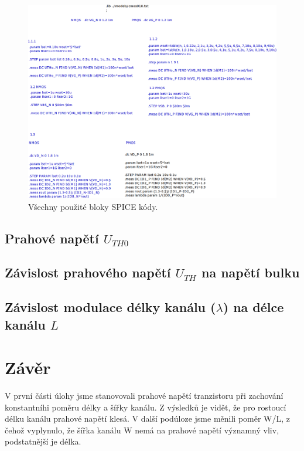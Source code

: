 \documentclass{protokol}
\begin{document}
  \begin{figure}[h!]
    \centering
    \includegraphics[width=\textwidth]{img/spice.png}
    \caption{Všechny použité bloky SPICE kódy.}
    \label{fig:img-spice-png}
  \end{figure}


  \clearpage
\subsection{Prahové napětí \(U_{TH0} \) }


\clearpage
\subsection{Závislost prahového napětí \(U_{TH} \) na napětí bulku}


\clearpage
\subsection{Závislost modulace délky kanálu (\(\lambda\)) na délce kanálu \( L\) }


\section{Závěr}
  V první části úlohy jsme stanovovali prahové napětí tranzistoru při zachování konstantníhi poměru délky a šířky kanálu. Z výsledků je vidět, že pro rostoucí délku kanálu prahové napětí klesá. V další podúloze jsme měnili poměr W/L, z čehož vyplynulo, že šířka kanálu W nemá na prahové napětí významný vliv, podstatnější je délka.
\end{document}

